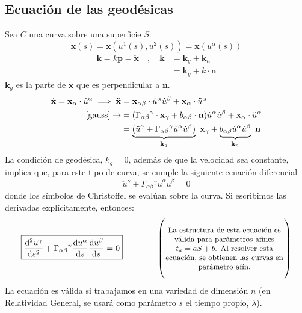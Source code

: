 \subsection{Ecuación de las geodésicas}
Sea $C$ una curva sobre una superficie $S$:
$$
\mathbf{x}(s)=\mathbf{x}(u^1(s),u^2(s))=\mathbf{x}(u^\alpha (s))
$$
\begin{equation*}
    \begin{split}
        \mathbf{k}=k\mathbf{p} =\ddot{\mathbf{x}} \quad , \quad \mathbf{k}&=\mathbf{k}_g+\mathbf{k}_n\\
        &=\mathbf{k}_g+k\cdot \mathbf{n}
    \end{split}
\end{equation*}
$\mathbf{k}_g$ es la parte de $\ddot{\mathbf{x}}$ que es perpendicular a $\mathbf{n}$. 
\begin{equation*}
    \begin{split}
        \dot{\mathbf{x}}=\mathbf{x}_\alpha \cdot \dot{u}^\alpha \implies \ddot{\mathbf{x}}&=\mathbf{x}_{\alpha \beta }\cdot \dot{u}^\alpha \dot{u}^\beta +\mathbf{x}_\alpha \cdot \ddot{u}^\alpha \\
        \ref{gauss} \rightarrow &=(\Gamma _{\alpha \beta }{}^\gamma \cdot \mathbf{x}_\gamma +b_{\alpha \beta }\cdot \mathbf{n})\dot{u}^\alpha \dot{u}^\beta +\mathbf{x}_\alpha \cdot \ddot{u}^\alpha \\
        &=\underbrace{(\ddot{u}^\gamma +\Gamma _{\alpha \beta }{}^\gamma \dot{u}^\alpha \dot{u}^\beta )}_{\mathbf{k}_g}\ \mathbf{x}_\gamma + \underbrace{b_{\alpha \beta }\dot{u}^\alpha \dot{u}^\beta }_{\mathbf{k}_n}\ \mathbf{n}
    \end{split}
\end{equation*}
\WFclear
La condición de geodésica, $k_g=0$, además de que la velocidad sea constante, implica que, para este tipo de curva, se cumple la siguiente ecuación diferencial
$$
\ddot{u}^\gamma +\Gamma _{\alpha \beta }{}^\gamma \dot{u}^\alpha \dot{u}^\beta=0
$$
donde los símbolos de Christoffel se evalúan sobre la curva. Si escribimos las derivadas explícitamente, entonces:
$$
\boxed{\dv[2]{u^\gamma }{s}+\Gamma _{\alpha \beta }{}^\gamma \dv{u^\alpha }{s}\dv{u^\beta }{s}=0} \qquad \qquad \left ( \text{\small \parbox{5cm}{\begin{center}
    La estructura de esta ecuación es válida para parámetros afines $t_a=aS+b$. Al resolver esta ecuación, se obtienen las curvas en parámetro afín.
\end{center}}} \right )
$$
La ecuación es válida si trabajamos en una variedad de dimensión $n$ (en Relatividad General, se usará como parámetro $s$ el tiempo propio, $\lambda $).
